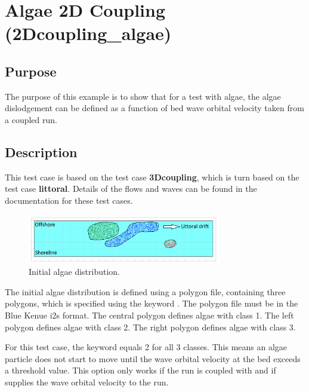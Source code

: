 \chapter{Algae 2D Coupling (2Dcoupling\_algae)}

\section{Purpose}

The purpose of this example is to show that for a test with algae, the algae
dislodgement can be defined as a function of bed wave orbital velocity taken
from a coupled \tomawac run.

\section{Description}

This test case is based on the \tomawac test case \textbf{3Dcoupling},
which is turn based on the \sisyphe test case \textbf{littoral}.
Details of the flows and waves can be found in the documentation for these test
cases.

\begin{figure}[h]%
  \begin{center}
    \includegraphics[width=0.75\textwidth]{./img/2Dcouple_initial_02}
  \end{center}
  \caption{Initial algae distribution.}
  \label{fig:exp2d_init}
\end{figure}

The initial algae distribution is defined using a polygon file, containing three
polygons, which is specified using the keyword
.
The polygon file must be in the Blue Kenue i2s format.
The central polygon defines algae with class 1.
The left polygon defines algae with class 2.
The right polygon defines algae with class 3.

\smallskip
For this test case, the keyword  equals 2 for all 3
classes.
This means an algae particle does not start to move until the wave orbital
velocity at the bed exceeds a threshold value.
This option only works if the  run is coupled with \tomawac and if
\tomawac supplies the wave orbital velocity to the  run.

